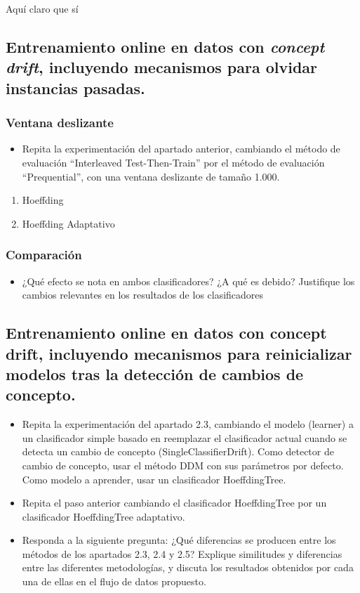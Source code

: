 \documentclass[11pt]{article}
\begin{document}
Aquí claro que sí


\subsection{Entrenamiento online en datos con \emph{concept drift}, incluyendo mecanismos para olvidar instancias pasadas.}
\label{sec:org8896302}

\subsubsection{Ventana deslizante}
\label{sec:org16f8ba5}
\begin{itemize}
\item Repita la experimentación del apartado anterior, cambiando el método
de evaluación “Interleaved Test-Then-Train” por el método de
evaluación “Prequential”, con una ventana deslizante de tamaño 1.000.
\end{itemize}

\begin{enumerate}
\item Hoeffding
\label{sec:orgecbe67c}

\item Hoeffding Adaptativo
\label{sec:orgb638d5d}
\end{enumerate}

\subsubsection{Comparación}
\label{sec:org78c3044}
\begin{itemize}
\item ¿Qué efecto se nota en ambos clasificadores? ¿A qué es debido?
Justifique los cambios relevantes en los resultados de los
clasificadores
\end{itemize}

\subsection{Entrenamiento online en datos con concept drift, incluyendo mecanismos para reinicializar modelos tras la detección de cambios de concepto.}
\label{sec:org98e764e}

\begin{itemize}
\item Repita la experimentación del apartado 2.3, cambiando el modelo
(learner) a un clasificador simple basado en reemplazar el
clasificador actual cuando se detecta un cambio de concepto
(SingleClassifierDrift). Como detector de cambio de concepto, usar
el método DDM con sus parámetros por defecto. Como modelo a
aprender, usar un clasificador HoeffdingTree.

\item Repita el paso anterior cambiando el clasificador HoeffdingTree por
un clasificador HoeffdingTree adaptativo.

\item Responda a la siguiente pregunta: ¿Qué diferencias se producen entre
los métodos de los apartados 2.3, 2.4 y 2.5? Explique similitudes y
diferencias entre las diferentes metodologías, y discuta los
resultados obtenidos por cada una de ellas en el flujo de datos
propuesto.
\end{itemize}
\end{document}
